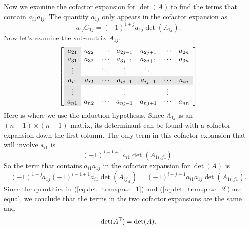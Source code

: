 Now we examine the cofactor expansion for $\det(A)$ to find the terms that contain $a_{i1}a_{1j}$. The quantity $a_{1j}$ only appears in the cofactor expansion as 
\[a_{1j}C_{1j} = (-1)^{1+j}a_{1j}\det(A_{1j}).\]
Now let's examine the sub-matrix $A_{1j}$: 
\[\left[ \begin{array}{>{\columncolor{Gray}}ccccccc}
a_{21} 	& a_{22} 	& \cdots    &a_{2j-1} &a_{2j+1} &\cdots & a_{2n} \\
a_{31} 	& a_{32} 	& \cdots    &a_{3j-1} &a_{3j+1} &\cdots & a_{3n} \\
\vdots 	&       		& \ddots    & \vdots   &\ddots 	 & 		 & \\
\rowcolor{Gray}
a_{i1} 	& a_{i2} 	& \cdots     &a_{ij-1} &a_{ij+1}   &\cdots & a_{in} \\
\vdots 	&       		&          	& \vdots   & 			  &\vdots &\\
a_{n1} 	& a_{n2} 	& \cdots    &a_{nj-1} &a_{nj+1}  &\cdots & a_{nn}
\end{array} \right] \]
Here is where we use the induction hypothesis. Since $A_{1j}$ is an $(n-1) \times (n-1)$ matrix, its determinant can be found with a cofactor expansion down the first column. The only term in this cofactor expansion that will involve $a_{i1}$ is 
\[(-1)^{i-1+1}a_{i1} \det(A_{1i, j1}).\]
So the term that contains $a_{i1}a_{1j}$ in the cofactor expansion for $\det(A)$ is 
\begin{equation} \label{eq:det_transpose_2}
(-1)^{1+j}a_{1j}(-1)^{i-1+1}a_{i1} \det(A_{1j_{i1}}) = (-1)^{i+j+1} a_{i1}a_{1j}\det(A_{1i, j1}).
\end{equation}
Since the quantities in (\ref{eq:det_transpose_1}) and (\ref{eq:det_transpose_2}) are equal, we conclude that the terms in the two cofactor expansions are the same and 
\[\det(A^{\mathsf{T}}) = \det(A).\]

\label{sec:det_row_swap}

